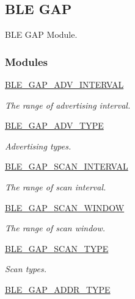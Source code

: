 \hypertarget{group___b_l_e___g_a_p}{}\subsection{B\+LE G\+AP}
\label{group___b_l_e___g_a_p}


B\+LE G\+AP Module.  


\subsubsection*{Modules}
\begin{DoxyCompactItemize}
\item 
\hyperlink{group___b_l_e___g_a_p___a_d_v___i_n_t_e_r_v_a_l}{B\+L\+E\+\_\+\+G\+A\+P\+\_\+\+A\+D\+V\+\_\+\+I\+N\+T\+E\+R\+V\+AL}
\begin{DoxyCompactList}\small\item\em The range of advertising interval. \end{DoxyCompactList}\item 
\hyperlink{group___b_l_e___g_a_p___a_d_v___t_y_p_e}{B\+L\+E\+\_\+\+G\+A\+P\+\_\+\+A\+D\+V\+\_\+\+T\+Y\+PE}
\begin{DoxyCompactList}\small\item\em Advertising types. \end{DoxyCompactList}\item 
\hyperlink{group___b_l_e___g_a_p___s_c_a_n___i_n_t_e_r_v_a_l}{B\+L\+E\+\_\+\+G\+A\+P\+\_\+\+S\+C\+A\+N\+\_\+\+I\+N\+T\+E\+R\+V\+AL}
\begin{DoxyCompactList}\small\item\em The range of scan interval. \end{DoxyCompactList}\item 
\hyperlink{group___b_l_e___g_a_p___s_c_a_n___w_i_n_d_o_w}{B\+L\+E\+\_\+\+G\+A\+P\+\_\+\+S\+C\+A\+N\+\_\+\+W\+I\+N\+D\+OW}
\begin{DoxyCompactList}\small\item\em The range of scan window. \end{DoxyCompactList}\item 
\hyperlink{group___b_l_e___g_a_p___s_c_a_n___t_y_p_e}{B\+L\+E\+\_\+\+G\+A\+P\+\_\+\+S\+C\+A\+N\+\_\+\+T\+Y\+PE}
\begin{DoxyCompactList}\small\item\em Scan types. \end{DoxyCompactList}\item 
\hyperlink{group___b_l_e___g_a_p___a_d_d_r___t_y_p_e}{B\+L\+E\+\_\+\+G\+A\+P\+\_\+\+A\+D\+D\+R\+\_\+\+T\+Y\+PE}

\end{DoxyCompactItemize}
